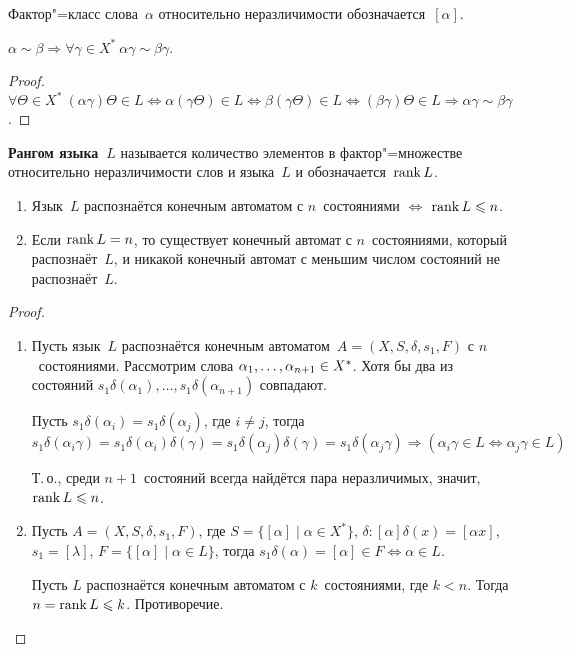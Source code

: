Фактор"=класс слова~$\alpha$ относительно неразличимости обозначается~$[\alpha]$.

\begin{statement}
$\alpha \sim \beta \Rightarrow \forall \gamma \in X^* \ \alpha \gamma \sim \beta \gamma$.
\end{statement}
\begin{proof}
$\forall \Theta \in X^* \ (\alpha \gamma) \Theta \in L \Leftrightarrow
\alpha (\gamma \Theta) \in L \Leftrightarrow
\beta (\gamma \Theta) \in L \Leftrightarrow
(\beta \gamma) \Theta \in L \Rightarrow
\alpha \gamma \sim \beta \gamma$.
\end{proof}

\textbf{Рангом языка~$L$} называется количество элементов в фактор"=множестве относительно неразличимости слов и языка~$L$ и обозначается~$\operatorname{rank} L$.

\begin{theorem}
\begin{enumerate}
	\item Язык~$L$ распознаётся конечным автоматом с $n$~состояниями $\Leftrightarrow$ $\operatorname{rank} L \leqslant n$.
	\item Если $\operatorname{rank} L = n$, то существует конечный автомат с $n$~состояниями, который распознаёт~$L$, и никакой конечный автомат с меньшим числом состояний не распознаёт~$L$.
\end{enumerate}
\end{theorem}
\begin{proof}
\begin{enumerate}
	\item Пусть язык~$L$ распознаётся конечным автоматом~$A = (X, S, \delta, s_1, F)$ с $n$~состояниями.
	Рассмотрим слова $\alpha_1, \ldots, \alpha_{n+1} \opbr\in X^*$.
	Хотя бы два из состояний $s_1 \delta(\alpha_1), \ldots, s_1 \delta(\alpha_{n+1})$ совпадают.
	
	Пусть $s_1 \delta(\alpha_i) = s_1 \delta(\alpha_j)$, где $i \neq j$, тогда
	\begin{equation*}
	s_1 \delta(\alpha_i \gamma) =
	s_1 \delta(\alpha_i) \delta(\gamma) =
	s_1 \delta(\alpha_j) \delta(\gamma) =
	s_1 \delta(\alpha_j \gamma) \Rightarrow
	(\alpha_i \gamma \in L \Leftrightarrow \alpha_j \gamma \in L)
	\end{equation*}
	
	Т.\,о., среди $n + 1$~состояний всегда найдётся пара неразличимых, значит, $\operatorname{rank} L \leqslant n$.
	
	\item Пусть $A = (X, S, \delta, s_1, F)$, где $S = \{ [\alpha] \mid \alpha \in X^* \}$, $\delta \colon [\alpha] \delta(x) = [\alpha x]$, $s_1 = [\lambda]$, $F = \{ [\alpha] \mid \alpha \in L \}$,
	тогда $s_1 \delta(\alpha) = [\alpha] \in F \Leftrightarrow \alpha \in L$.
	
	Пусть $L$ распознаётся конечным автоматом с $k$~состояниями, где $k < n$.
	Тогда $n = \operatorname{rank} L \leqslant k$.
	Противоречие.
\end{enumerate}
\end{proof}

